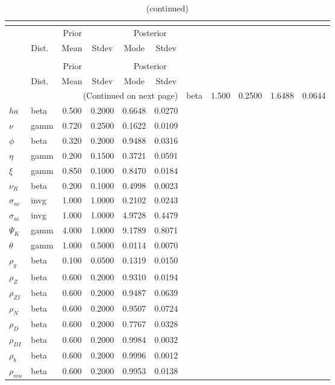  
\begin{center}
\begin{longtable}{llcccc} 
\caption{Results from posterior maximization (parameters)}\\
 \label{Table:Posterior:1}\\
\toprule 
  & \multicolumn{3}{c}{Prior}  &  \multicolumn{2}{c}{Posterior} \\
  \cmidrule(r{.75em}){2-4} \cmidrule(r{.75em}){5-6}
  & Dist. & Mean  & Stdev & Mode & Stdev \\ 
\midrule \endfirsthead 
\caption{(continued)}\\
 \bottomrule 
  & \multicolumn{3}{c}{Prior}  &  \multicolumn{2}{c}{Posterior} \\
  \cmidrule(r{.75em}){2-4} \cmidrule(r{.75em}){5-6}
  & Dist. & Mean  & Stdev & Mode & Stdev \\ 
\midrule \endhead 
\bottomrule \multicolumn{6}{r}{(Continued on next page)}\endfoot 
\bottomrule\endlastfoot 
${\sigma}$ & beta &   1.500 & 0.2500 &   1.6488 &  0.0644 \\ 
${ha}$ & beta &   0.500 & 0.2000 &   0.6648 &  0.0270 \\ 
$\nu$ & gamm &   0.720 & 0.2500 &   0.1622 &  0.0109 \\ 
${\phi}$ & beta &   0.320 & 0.2000 &   0.9488 &  0.0316 \\ 
${\eta}$ & gamm &   0.200 & 0.1500 &   0.3721 &  0.0591 \\ 
$\xi$ & gamm &   0.850 & 0.1000 &   0.8470 &  0.0184 \\ 
${\nu_R}$ & beta &   0.200 & 0.1000 &   0.4998 &  0.0023 \\ 
${\sigma_{ac}}$ & invg &   1.000 & 1.0000 &   0.2102 &  0.0243 \\ 
${\sigma_{ai}}$ & invg &   1.000 & 1.0000 &   4.9728 &  0.4479 \\ 
${\Psi_{K}}$ & gamm &   4.000 & 1.0000 &   9.1789 &  0.8071 \\ 
${\theta}$ & gamm &   1.000 & 0.5000 &   0.0114 &  0.0070 \\ 
${\rho_g}$ & beta &   0.100 & 0.0500 &   0.1319 &  0.0150 \\ 
${\rho_Z}$ & beta &   0.600 & 0.2000 &   0.9310 &  0.0194 \\ 
${\rho_{ZI}}$ & beta &   0.600 & 0.2000 &   0.9487 &  0.0639 \\ 
${\rho_N}$ & beta &   0.600 & 0.2000 &   0.9507 &  0.0724 \\ 
${\rho_D}$ & beta &   0.600 & 0.2000 &   0.7767 &  0.0328 \\ 
${\rho_{DI}}$ & beta &   0.600 & 0.2000 &   0.9984 &  0.0032 \\ 
${\rho_b}$ & beta &   0.600 & 0.2000 &   0.9996 &  0.0012 \\ 
${\rho_{mu}}$ & beta &   0.600 & 0.2000 &   0.9953 &  0.0138 \\ 
\end{longtable}
 \end{center}
